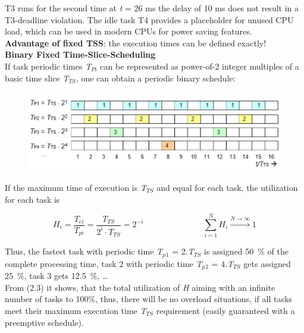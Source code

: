 T3 runs for the second time at \textit{t} = 26 ms the delay of 10 ms does not result in a T3-deadline violation. The idle task T4 provides a placeholder for unused CPU load, which can be used in modern CPUs for power saving features.\\

\textbf{Advantage of fixed TSS}: the execution times can be defined exactly!\\

{\rot\bf Binary Fixed Time-Slice-Scheduling }\\

If task periodic times \textit{T${}_{Pi}$} can be represented as power-of-2 integer multiples of a basic time slice \textit{T${}_{TS}$}, one can obtain a periodic binary schedule:\\

	\begin{figure}[h]
    \centering
    \includegraphics[width=12cm, height=3.5cm]{Images/image94.png}
    \label{fig:Fig }
    \end{figure}

If the maximum time of execution is \textit{T}${}_{TS}$ and equal for each task, the utilization for each task is 

\begin{equation}
	 H_{i} =\frac{T_{ei} }{T_{pi} } =\frac{T_{TS} }{2^{i} \cdot T_{TS} } =2^{-i} \hspace{3cm} \sum_{i=1}^N H_{i} \stackrel{N\to \infty }{\longrightarrow} 1
\label{EQ }
\end{equation}

Thus, the fastest task with periodic time \textit{T${}_{p}$}${}_{1}$ = 2$.$\textit{T}${}_{TS}$ is assigned 50~\% of the complete processing time, task 2 with periodic time \textit{T${}_{p}$}${}_{2}$ = 4$.$\textit{T}${}_{TS}$ gets assigned 25~\%, task 3 gets 12.5~\%, {\dots}\\

From (2.3) it shows, that the total utilization of \textit{H} aiming with an infinite number of tasks to 100\%, thus, there will be no overload situations, if all tasks meet their maximum execution time \textit{T${}_{TS}$} requirement (easily guaranteed with a preemptive schedule).\\

